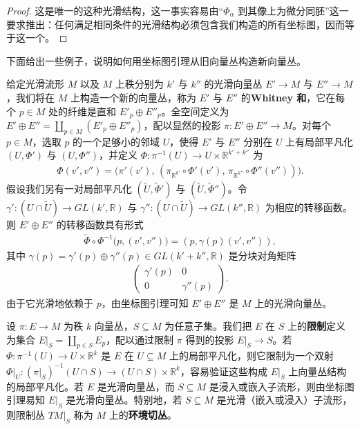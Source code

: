 \documentclass[../../main.tex]{subfiles}
\begin{document}
\begin{proof}
这是唯一的这种光滑结构，这一事实容易由“$\Phi_\alpha$ 到其像上为微分同胚”这一要求推出：任何满足相同条件的光滑结构必须包含我们构造的所有坐标图，因而等于这一个。
\end{proof}

下面给出一些例子，说明如何用坐标图引理从旧向量丛构造新向量丛。

\begin{example}[Whitney 和]\label{example:ch10-whitney和}
给定光滑流形 $M$ 以及 $M$ 上秩分别为 $k'$ 与 $k''$ 的光滑向量丛 $E'\to M$ 与 $E''\to M$，我们将在 $M$ 上构造一个新的向量丛，称为 $E'$ 与 $E''$ 的\textbf{Whitney 和}，它在每个 $p\in M$ 处的纤维是直和 $E'_p\oplus E''_p$。全空间定义为 $E'\oplus E''=\coprod_{p\in M}(E'_p\oplus E''_p)$，配以显然的投影 $\pi\colon E'\oplus E''\to M$。对每个 $p\in M$，选取 $p$ 的一个足够小的邻域 $U$，使得 $E'$ 与 $E''$ 分别在 $U$ 上有局部平凡化 $(U,\Phi')$ 与 $(U,\Phi'')$，并定义 $\Phi\colon\pi^{-1}(U)\to U\times\mathbb{R}^{k'+k''}$ 为
\begin{align*}
\Phi(v',v'')=\big(\pi'(v'),\,(\pi_{\mathbb{R}^{k'}}\circ\Phi'(v'),\,\pi_{\mathbb{R}^{k''}}\circ\Phi''(v''))\big).
\end{align*}
假设我们另有一对局部平凡化 $(\widetilde U,\widetilde\Phi')$ 与 $(\widetilde U,\widetilde\Phi'')$。令 $\gamma'\colon(U\cap\widetilde U)\to GL(k',\mathbb{R})$ 与 $\gamma''\colon(U\cap\widetilde U)\to GL(k'',\mathbb{R})$ 为相应的转移函数。则 $E'\oplus E''$ 的转移函数具有形式
\begin{align*}
\widetilde\Phi\circ\Phi^{-1}\big(p,(v',v'')\big)=(p,\gamma(p)(v',v'')),
\end{align*}
其中 $\gamma(p)=\gamma'(p)\oplus\gamma''(p)\in GL(k'+k'',\mathbb{R})$ 是分块对角矩阵
\begin{align*}
\begin{pmatrix}\gamma'(p)&0\\ 0&\gamma''(p)\end{pmatrix}.
\end{align*}
由于它光滑地依赖于 $p$，由坐标图引理可知 $E'\oplus E''$ 是 $M$ 上的光滑向量丛。
\end{example}

\begin{example}[向量丛的限制]\label{example:ch10-丛的限制}
设 $\pi\colon E\to M$ 为秩 $k$ 向量丛，$S\subseteq M$ 为任意子集。我们把 $E$ 在 $S$ 上的\textbf{限制}定义为集合 $E|_S=\coprod_{p\in S}E_p$，配以通过限制 $\pi$ 得到的投影 $E|_S\to S$。若 $\Phi\colon\pi^{-1}(U)\to U\times\mathbb{R}^k$ 是 $E$ 在 $U\subseteq M$ 上的局部平凡化，则它限制为一个双射 $\Phi|_U\colon(\pi|_S)^{-1}(U\cap S)\to(U\cap S)\times\mathbb{R}^k$，容易验证这些构成 $E|_S$ 上向量丛结构的局部平凡化。若 $E$ 是光滑向量丛，而 $S\subseteq M$ 是浸入或嵌入子流形，则由坐标图引理易知 $E|_S$ 是光滑向量丛。特别地，若 $S\subseteq M$ 是光滑（嵌入或浸入）子流形，则限制丛 $TM|_S$ 称为 $M$ 上的\textbf{环境切丛}。
\end{example}
\end{document}
